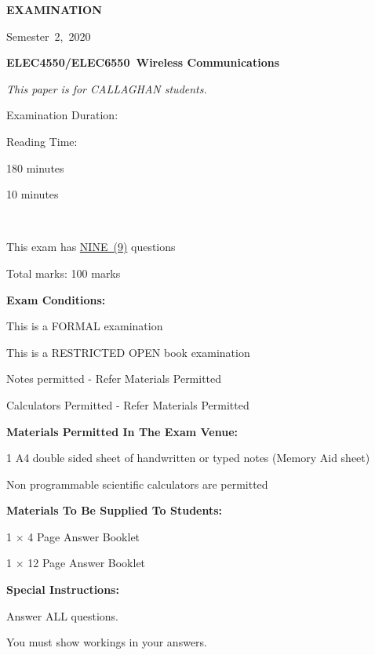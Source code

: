\documentclass[a4paper,12pt]{article}
\newcommand{\semester}{2} %
\newcommand{\examyear}{2020} %
\newcommand{\subjectname}{Wireless Communications} %
\newcommand{\modulecode}{ELEC4550/ELEC6550} %
\newcounter{question}[section]
\begin{document}
\begin{doublespace}
\begin{center}
    \textbf{\large EXAMINATION}

    
    \textnormal{\footnotesize Semester~\semester,~\examyear}

    
    \textbf{\large \modulecode~\subjectname}


    \textit{\footnotesize This paper is for CALLAGHAN students.}
  \end{center}

  {\footnotesize

    \begin{minipage}[t]{0.33\linewidth}
      
      \footnotesize

      Examination Duration:

      Reading Time:

    \end{minipage}
    \begin{minipage}[t]{0.3\linewidth}
      
      \footnotesize

      180 minutes

      10 minutes

    \end{minipage}\\

    \vspace{-1mm}

    This exam has \underline{NINE~(9)} questions
    
    Total marks: 100 marks
    
    \textbf{Exam Conditions:}

    This is a FORMAL examination

    This is a RESTRICTED OPEN book examination

    Notes permitted - Refer Materials Permitted

    Calculators Permitted - Refer Materials Permitted

    \textbf{Materials Permitted In The Exam Venue:}

    1 A4 double sided sheet of handwritten or typed notes (Memory Aid sheet)

    Non programmable scientific calculators are permitted

    \textbf{Materials To Be Supplied To Students:}

    1 $\times$ 4 Page Answer Booklet

    1 $\times$ 12 Page Answer Booklet

    
    \textbf{Special Instructions:}
    
    Answer ALL questions.
    
    You must show workings in your answers.

    {\ }}
\end{doublespace}
\end{document}
